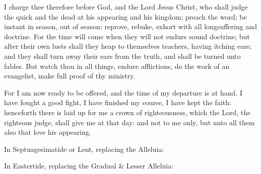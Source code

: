 \label{2Timothy41}\label{CommonDoctorsEpistle}
 I charge thee therefore before God, and the Lord Jesus Christ, who shall judge the quick and the dead at his appearing and his kingdom; preach the word; be instant in season, out of season; reprove, rebuke, exhort with all longsuffering and doctrine. For the time will come when they will not endure sound doctrine; but after their own lusts shall they heap to themselves teachers, having itching ears; and they shall turn away their ears from the truth, and shall be turned unto fables. But watch thou in all things, endure afflictions, do the work of an evangelist, make full proof of thy ministry.\par
For I am now ready to be offered, and the time of my departure is at hand. I have fought a good fight, I have finished my course, I have kept the faith: henceforth there is laid up for me a crown of righteousness, which the Lord, the righteous judge, shall give me at that day: and not to me only, but unto all them also that love his appearing.


\begin{rubric}
{In Septuagesimatide or Lent, replacing the Alleluia:}
\end{rubric}

\vspace{-1ex}


\begin{rubric}
{In Eastertide, replacing the Gradual \& Lesser Alleluia:}
\end{rubric}

\vspace{-1ex}


